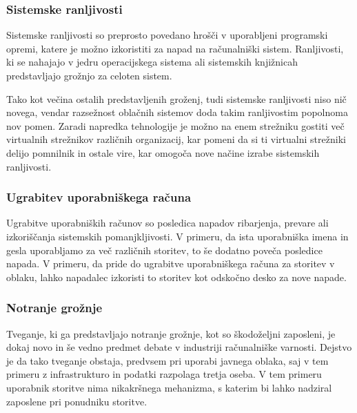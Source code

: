 \documentclass[12pt,a4paper,openany]{book}
\begin{document}
\subsubsection{Sistemske ranljivosti}
Sistemske ranljivosti so preprosto povedano hrošči v uporabljeni programski opremi, katere je možno izkoristiti za napad na računalniški sistem. Ranljivosti, ki se nahajajo v jedru operacijskega sistema ali sistemskih knjižnicah predstavljajo grožnjo za celoten sistem.

Tako kot večina ostalih predstavljenih groženj, tudi sistemske ranljivosti niso nič novega, vendar razsežnost oblačnih sistemov doda takim ranljivostim popolnoma nov pomen. Zaradi napredka tehnologije je možno na enem strežniku gostiti več virtualnih strežnikov različnih organizacij, kar pomeni da si ti virtualni strežniki delijo pomnilnik in ostale vire, kar omogoča nove načine izrabe sistemskih ranljivosti.

\subsubsection{Ugrabitev uporabniškega računa}
Ugrabitve uporabniških računov so posledica napadov ribarjenja, prevare ali izkoriščanja sistemskih pomanjkljivosti. V primeru, da ista uporabniška imena in gesla uporabljamo za več različnih storitev, to še dodatno poveča posledice napada. V primeru, da pride do ugrabitve uporabniškega računa za storitev v oblaku, lahko napadalec izkoristi to storitev kot odskočno desko za nove napade.

\subsubsection{Notranje grožnje}
Tveganje, ki ga predstavljajo notranje grožnje, kot so škodoželjni zaposleni, je dokaj novo in še vedno predmet debate v industriji računalniške varnosti. Dejstvo je da tako tveganje obstaja, predvsem pri uporabi javnega oblaka, saj v tem primeru z infrastrukturo in podatki razpolaga tretja oseba. V tem primeru uporabnik storitve nima nikakršnega mehanizma, s katerim bi lahko nadziral zaposlene pri ponudniku storitve.
\end{document}

